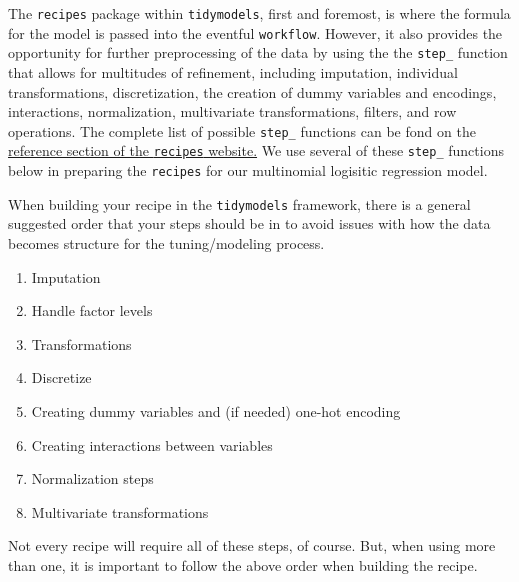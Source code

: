 \documentclass[
  letterpaper,
]{krantz}
\providecommand{\tightlist}{%
  \setlength{\itemsep}{0pt}\setlength{\parskip}{0pt}}\usepackage{longtable,booktabs,array}
\begin{document}
The \texttt{recipes} package within \texttt{tidymodels}, first and
foremost, is where the formula for the model is passed into the eventful
\texttt{workflow}. However, it also provides the opportunity for further
preprocessing of the data by using the the \texttt{step\_} function that
allows for multitudes of refinement, including imputation, individual
transformations, discretization, the creation of dummy variables and
encodings, interactions, normalization, multivariate transformations,
filters, and row operations. The complete list of possible
\texttt{step\_} functions can be fond on the
\href{https://recipes.tidymodels.org/reference/index.html}{reference
section of the \texttt{recipes} website.} We use several of these
\texttt{step\_} functions below in preparing the \texttt{recipes} for
our multinomial logisitic regression model.

\begin{tcolorbox}[enhanced jigsaw, left=2mm, toprule=.15mm, opacitybacktitle=0.6, leftrule=.75mm, bottomrule=.15mm, colbacktitle=quarto-callout-tip-color!10!white, breakable, colback=white, bottomtitle=1mm, toptitle=1mm, title=\textcolor{quarto-callout-tip-color}{\faLightbulb}\hspace{0.5em}{Tip}, coltitle=black, titlerule=0mm, arc=.35mm, opacityback=0, colframe=quarto-callout-tip-color-frame, rightrule=.15mm]

When building your recipe in the \texttt{tidymodels} framework, there is
a general suggested order that your steps should be in to avoid issues
with how the data becomes structure for the tuning/modeling process.

\begin{enumerate}
\def\labelenumi{\arabic{enumi}.}
\tightlist
\item
  Imputation
\item
  Handle factor levels
\item
  Transformations
\item
  Discretize
\item
  Creating dummy variables and (if needed) one-hot encoding
\item
  Creating interactions between variables
\item
  Normalization steps
\item
  Multivariate transformations
\end{enumerate}

Not every recipe will require all of these steps, of course. But, when
using more than one, it is important to follow the above order when
building the recipe.

\end{tcolorbox}
\end{document}

